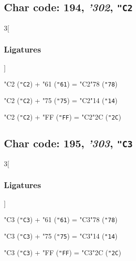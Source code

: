 \documentclass{article}
\newlength{\maxcharwidth}
\begin{document}
\subsection{Char code: 194, {\it'302}, {\tt"C2}}
\label{char_194}


\begin{multicols}{3}[\subsubsection{Ligatures}]

{\testfont\char"C2\noboundary} ({\tt"C2}) + {\testfont\char"61\noboundary} ({\tt"61}) = {\testfont\char"C2\noboundary}{\testfont\char"78\noboundary} ({\tt"78}) 

{\testfont\char"C2\noboundary} ({\tt"C2}) + {\testfont\char"75\noboundary} ({\tt"75}) = {\testfont\char"C2\noboundary}{\testfont\char"14\noboundary} ({\tt"14}) 

{\testfont\char"C2\noboundary} ({\tt"C2}) + {\testfont\char"FF\noboundary} ({\tt"FF}) = {\testfont\char"C2\noboundary}{\testfont\char"2C\noboundary} ({\tt"2C}) 

\end{multicols}

\subsection{Char code: 195, {\it'303}, {\tt"C3}}
\label{char_195}


\begin{multicols}{3}[\subsubsection{Ligatures}]

{\testfont\char"C3\noboundary} ({\tt"C3}) + {\testfont\char"61\noboundary} ({\tt"61}) = {\testfont\char"C3\noboundary}{\testfont\char"78\noboundary} ({\tt"78}) 

{\testfont\char"C3\noboundary} ({\tt"C3}) + {\testfont\char"75\noboundary} ({\tt"75}) = {\testfont\char"C3\noboundary}{\testfont\char"14\noboundary} ({\tt"14}) 

{\testfont\char"C3\noboundary} ({\tt"C3}) + {\testfont\char"FF\noboundary} ({\tt"FF}) = {\testfont\char"C3\noboundary}{\testfont\char"2C\noboundary} ({\tt"2C}) 

\end{multicols}
\end{document}
